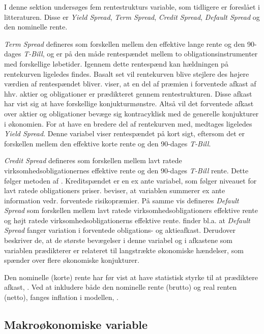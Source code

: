 \documentclass[
  a4paper,
  oneside]{memoir}
\begin{document}
I denne sektion undersøges fem rentestrukturs variable, som tidligere er foreslået i litteraturen. Disse er \emph{Yield Spread}, \emph{Term Spread}, \emph{Credit Spread}, \emph{Default Spread} og den nominelle rente.

\emph{Term Spread} defineres som forskellen mellem den effektive lange rente og den 90-dages \emph{T-Bill}, og er på den måde rentespændet mellem to obligationsinstrumenter med forskellige løbetider. Igennem dette rentespænd kan hældningen på rentekurven ligeledes findes. Basalt set vil rentekurven blive stejlere des højere værdien af rentespændet bliver. \citep{Fama1989} viser, at en del af præmien i forventede afkast af hhv. aktier og obligationer er prædikteret gennem rentestrukturen. Disse afkast har vist sig at have forskellige konjukturmønstre. Altså vil det forventede afkast over aktier og obligationer bevæge sig kontracyklisk med de generelle konjukturer i økonomien. For at have en bredere del af rentekurven med, medtages ligeledes \emph{Yield Spread}. Denne variabel viser rentespændet på kort sigt, eftersom det er forskellen mellem den effektive korte rente og den 90-dages \emph{T-Bill}.

\emph{Credit Spread} defineres som forskellen mellem lavt ratede virksomhedsobligationernes effektive rente og den 90-dages \emph{T-Bill} rente. Dette følger metoden af \citep{Keim1986}. Kreditspændet er en ex ante variabel, som følger niveauet for lavt ratede obligationers priser. \citep{Keim1986} beviser, at variablen summerer ex ante information vedr. forventede risikopræmier. På samme vis defineres \emph{Default Spread} som forskellen mellem lavt ratede virksomhedsobligationers effektive rente og højt ratede virksomhedsobligationerns effektive rente. \citep{Fama1989} finder bl.a. at \emph{Default Spread} fanger variation i forventede obligations- og aktieafkast. Derudover beskriver de, at de største bevægelser i denne variabel og i afkastene som variablen prædikterer er relateret til langstrækte økonomiske hændelser, som spænder over flere økonomiske konjukturer.

Den nominelle (korte) rente har før vist at have statistisk styrke til at prædiktere afkast, \citep{Campbell2005}. Ved at inkludere både den nominelle rente (brutto) og real renten (netto), fanges inflation i modellen, \citep{Campbell2005}.

\hypertarget{makrouxf8konomiske-variable}{%
\subsection{Makroøkonomiske variable}\label{makrouxf8konomiske-variable}}
\end{document}
